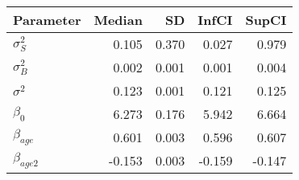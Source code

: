 \begin{table}[ht]
\centering
\begin{tabular}{lrrrr}
  \hline
Parameter & Median & SD & InfCI & SupCI \\ 
  \hline
$\sigma^{2}_{S}$ & 0.105 & 0.370 & 0.027 & 0.979 \\ 
  $\sigma^{2}_{B}$ & 0.002 & 0.001 & 0.001 & 0.004 \\ 
  $\sigma^{2}$ & 0.123 & 0.001 & 0.121 & 0.125 \\ 
  $\beta_{0}$ & 6.273 & 0.176 & 5.942 & 6.664 \\ 
  $\beta_{age}$ & 0.601 & 0.003 & 0.596 & 0.607 \\ 
  $\beta_{age2}$ & -0.153 & 0.003 & -0.159 & -0.147 \\ 
   \hline
\end{tabular}
\end{table}

